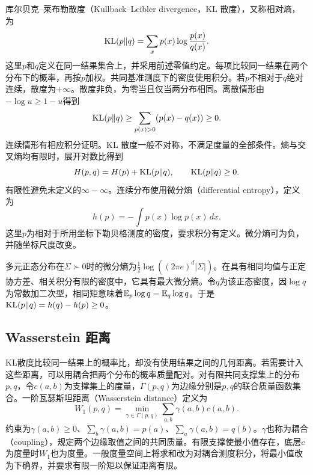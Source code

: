 库尔贝克--莱布勒散度（Kullback--Leibler divergence，KL 散度），又称相对熵，为
\begin{equation}
 \operatorname{KL}(p\|q)=\sum_xp(x)\log\frac{p(x)}{q(x)}.
 \label{eq:math-kl-distance}
\end{equation}
这里$p$和$q$定义在同一结果集合上，并采用前述零值约定。每项比较同一结果在两个分布下的概率，再按$p$加权。共同基准测度下的密度使用积分。若$p$不相对于$q$绝对连续，散度为$+\infty$。散度非负，为零当且仅当两分布相同。离散情形由$-\log u\geq1-u$得到
\begin{equation}
 \operatorname{KL}(p\|q)\geq\sum_{p(x)>0}(p(x)-q(x))\geq0.
\end{equation}
连续情形有相应积分证明。KL 散度一般不对称，不满足度量的全部条件。熵与交叉熵均有限时，展开对数比得到
\begin{equation}
 H(p,q)=H(p)+\operatorname{KL}(p\|q),\qquad\operatorname{KL}(p\|q)\geq0.
 \label{eq:math-cross-entropy-kl}
\end{equation}
有限性避免未定义的$\infty-\infty$。连续分布使用微分熵（differential entropy），定义为
\begin{equation}
 h(p)=-\int p(x)\log p(x)\,dx.
\end{equation}
这里$p$为相对于所用坐标下勒贝格测度的密度，要求积分有定义。微分熵可为负，并随坐标尺度改变。

多元正态分布在$\Sigma\succ0$时的微分熵为$\tfrac12\log((2\pi e)^d|\Sigma|)$。在具有相同均值与正定协方差、相关积分有限的密度中，它具有最大微分熵。令$q$为该正态密度，因$\log q$为常数加二次型，相同矩意味着$\mathbb{E}_p\log q=\mathbb{E}_q\log q$。于是$\operatorname{KL}(p\|q)=h(q)-h(p)\geq0$。

\subsection{Wasserstein 距离}
KL散度比较同一结果上的概率比，却没有使用结果之间的几何距离。若需要计入这些距离，可以用耦合把两个分布的概率质量配对。对有限共同支撑集上的分布$p,q$，令$c(a,b)$为支撑集上的度量，$\Gamma(p,q)$为边缘分别是$p,q$的联合质量函数集合。一阶瓦瑟斯坦距离（Wasserstein distance）定义为
\begin{equation}
 W_1(p,q)=\min_{\gamma\in\Gamma(p,q)}\sum_{a,b}\gamma(a,b)c(a,b).
 \label{eq:math-wasserstein-distance}
\end{equation}
约束为$\gamma(a,b)\geq0$、$\sum_b\gamma(a,b)=p(a)$、$\sum_a\gamma(a,b)=q(b)$。$\gamma$也称为耦合（coupling），规定两个边缘取值之间的共同质量。有限支撑使最小值存在，底层$c$为度量时$W_1$也为度量。一般度量空间上将求和改为对耦合测度积分，将最小值改为下确界，并要求有限一阶矩以保证距离有限。

